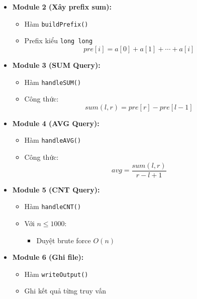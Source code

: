 \begin{itemize}
\begin{itemize}
        \item \textbf{Module 2 (Xây prefix sum):}

        \begin{itemize}
            \item Hàm \texttt{buildPrefix()}
            \item Prefix kiểu \texttt{long long}
            \[
                pre[i]=a[0]+a[1]+\cdots+a[i]
            \]
        \end{itemize}

        \item \textbf{Module 3 (SUM Query):}

        \begin{itemize}
            \item Hàm \texttt{handleSUM()}
            \item Công thức:
            \[
                sum(l,r)=pre[r]-pre[l-1]
            \]
        \end{itemize}

        \item \textbf{Module 4 (AVG Query):}

        \begin{itemize}
            \item Hàm \texttt{handleAVG()}
            \item Công thức:
            \[
                avg=\frac{sum(l,r)}{r-l+1}
            \]
        \end{itemize}

        \item \textbf{Module 5 (CNT Query):}

        \begin{itemize}
            \item Hàm \texttt{handleCNT()}
            \item Với \(n \le 1000\):
            \begin{itemize}
                \item Duyệt brute force \(O(n)\)
            \end{itemize}
        \end{itemize}

        \item \textbf{Module 6 (Ghi file):}

        \begin{itemize}
            \item Hàm \texttt{writeOutput()}
            \item Ghi kết quả từng truy vấn
        \end{itemize}


\end{itemize}
\end{itemize}
